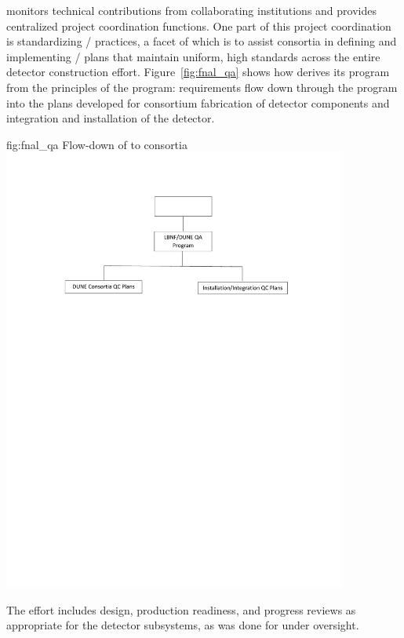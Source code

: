   monitors technical contributions from
collaborating institutions and provides centralized project
coordination functions. One part of this project coordination is
standardizing / practices, a facet
of which is to assist consortia in defining and implementing
/ plans that maintain uniform, high
standards across the entire detector construction
effort. Figure~\ref{fig:fnal_qa} shows how  
derives its  program from the principles of the \fnal {} program:
requirements %
flow down through the 
 program into the  plans developed for consortium fabrication of
detector components and integration and installation of the detector.
\begin{dunefigure}{fig:fnal_qa}
  {Flow-down of \fnal {} to consortia}
  \includegraphics[width=0.85\textwidth]{graphics/fnal_qa.pdf}
\end{dunefigure}
The  effort includes design, production readiness, and
progress reviews as appropriate for the  detector
subsystems, as was done for  under 
oversight.

